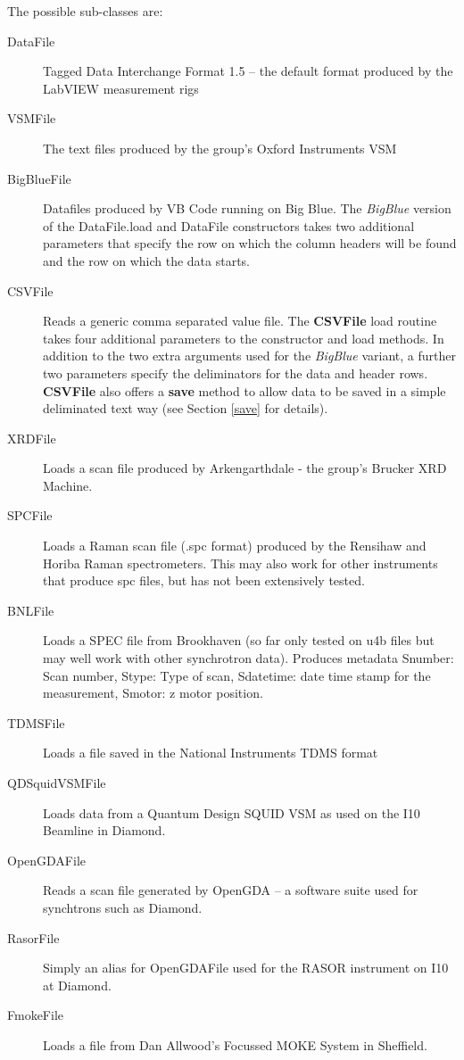 \documentclass[a4paper,11pt]{scrartcl}
\begin{document}
The possible sub-classes are:
\begin{description}
\item[DataFile] Tagged Data Interchange Format 1.5 -- the default format produced by
the LabVIEW measurement rigs
\item[VSMFile] The text files produced by the group's Oxford Instruments VSM
\item[BigBlueFile] Datafiles produced by VB Code running on Big Blue. The
\textit{BigBlue} version of the DataFile.load and DataFile constructors takes
two additional parameters that specify the row on which the column headers will
be found and the row on which the data starts.
\item[CSVFile] Reads a generic comma separated value file. The \textbf{CSVFile} load
routine takes four additional parameters to the constructor and load methods. In
addition to the two extra arguments used for the \textit{BigBlue} variant, a
further two parameters specify the deliminators for the data and header rows. \textbf{CSVFile} also offers a \textbf{save} method to allow data to be saved in a simple deliminated text way (see Section \ref{save} for details).
\item[XRDFile] Loads a scan file produced by Arkengarthdale - the group's Brucker
XRD Machine.
\item[SPCFile] Loads a Raman scan file (.spc format) produced by the Rensihaw and Horiba
Raman spectrometers. This may also work for other instruments that produce spc files, but has not been extensively tested.
\item[BNLFile] Loads a SPEC file from Brookhaven (so far only tested on u4b files but may well work with other synchrotron data). Produces metadata Snumber: Scan number, Stype: Type of scan, Sdatetime: date time stamp for the measurement, Smotor: z motor position.
\item[TDMSFile] Loads a file saved in the National Instruments TDMS format
\item [QDSquidVSMFile] Loads data from a Quantum Design SQUID VSM as used on the I10 Beamline in Diamond.
\item [OpenGDAFile] Reads a scan file generated by OpenGDA -- a software suite used for synchtrons such as Diamond.
\item [RasorFile] Simply an alias for OpenGDAFile used for the RASOR instrument on I10 at Diamond.
\item [FmokeFile] Loads a file from Dan Allwood's Focussed MOKE System in Sheffield.
\end{description}
\end{document}
